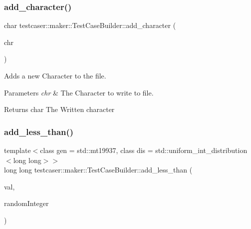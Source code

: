 \subsubsection{\texorpdfstring{add\+\_\+character()}{add\_character()}}
{\footnotesize\ttfamily char testcaser\+::maker\+::\+Test\+Case\+Builder\+::add\+\_\+character (\begin{DoxyParamCaption}\item[{char}]{chr }\end{DoxyParamCaption})\hspace{0.3cm}{\ttfamily [inline]}}



Adds a new Character to the file. 


\begin{DoxyParams}{Parameters}
{\em chr} & The Character to write to file. \\
\hline
\end{DoxyParams}
\begin{DoxyReturn}{Returns}
char The Written character 
\end{DoxyReturn}
\mbox{\label{classtestcaser_1_1maker_1_1TestCaseBuilder_a6649b1f108aae10780562876df58a5b2}} 
\subsubsection{\texorpdfstring{add\+\_\+less\+\_\+than()}{add\_less\_than()}\hspace{0.1cm}{\footnotesize\ttfamily [1/2]}}
{\footnotesize\ttfamily template$<$class gen  = std\+::mt19937, class dis  = std\+::uniform\+\_\+int\+\_\+distribution$<$long long$>$$>$ \\
long long testcaser\+::maker\+::\+Test\+Case\+Builder\+::add\+\_\+less\+\_\+than (\begin{DoxyParamCaption}\item[{long long}]{val,  }\item[{\hyperlink{classtestcaser_1_1maker_1_1types_1_1RandomInteger}{types\+::\+Random\+Integer}$<$ gen, dis $>$ \&}]{random\+Integer }\end{DoxyParamCaption})\hspace{0.3cm}{\ttfamily [inline]}}



